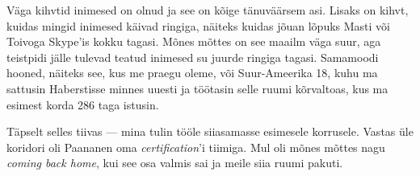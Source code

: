 Väga kihvtid inimesed on olnud ja see on kõige tänuväärsem asi. Lisaks on kihvt, kuidas mingid inimesed käivad ringiga, näiteks kuidas 
jõuan lõpuks Masti või Toivoga 
Skype'is kokku tagasi. Mõnes mõttes on see maailm väga suur, aga teistpidi 
jälle tulevad teatud inimesed su juurde ringiga tagasi. Samamoodi hooned, näiteks see, kus me praegu oleme, või Suur-Ameerika 18, kuhu ma sattusin 
Haberstisse minnes uuesti ja töötasin selle ruumi kõrvaltoas, kus ma esimest korda 
286 taga istusin. 


Täpselt selles tiivas --- mina tulin tööle siiasamasse esimesele korrusele. 
Vastas üle koridori oli Paananen oma 
\emph{certification}'i tiimiga. Mul oli mõnes mõttes nagu \emph{coming 
back home}, kui see osa valmis sai ja meile siia ruumi 
pakuti. 